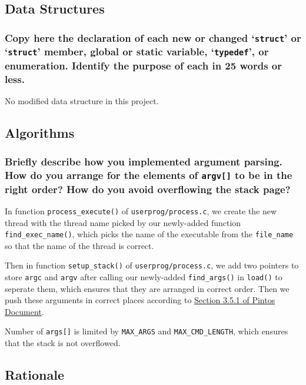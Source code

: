 \documentclass[sigconf, nonacm, balance=false, urlbreakonhyphens=true]{acmart}
\begin{document}
        \label{Argument Passing}
    
        \subsection{Data Structures}
        
            \subsubsection{Copy here the declaration of each new or changed `\texttt{struct}' or `\texttt{struct}' member, global or static variable, `\texttt{typedef}', or enumeration. Identify the purpose of each in 25 words or less. } 
            
            No modified data structure in this project. 
        
        \subsection{Algorithms}
        
            \subsubsection{Briefly describe how you implemented argument parsing.  How do you arrange for the elements of \texttt{argv[]} to be in the right order?  How do you avoid overflowing the stack page? }

            In function \texttt{process\_execute()} of \texttt{userprog/process.c}, we create the new thread with the thread name picked by our newly-added function \texttt{find\_exec\_name()}, which picks the name of the executable from the \texttt{file\_name} so that the name of the thread is correct. 

            Then in function \texttt{setup\_stack()} of \texttt{userprog/process.c}, we add two pointers to store \texttt{argc} and \texttt{argv} after calling our newly-added \texttt{find\_args()} in \texttt{load()} to seperate them, which ensures that they are arranged in correct order. Then we push these arguments in correct places according to \href{http://web.stanford.edu/~ouster/cgi-bin/cs140-spring20/pintos/pintos_3.html#SEC51}{Section 3.5.1 of Pintos Document}. 

            Number of \texttt{args[]} is limited by \texttt{MAX\_ARGS} and \texttt{MAX\_CMD\_LENGTH}, which ensures that the stack is not overflowed. 
        
        \subsection{Rationale}
            
\end{document}
